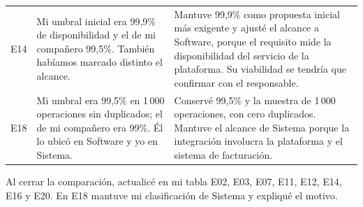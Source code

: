 \documentclass[10pt,letterpaper,landscape]{article}
\begin{document}
\begin{longtable}{@{}p{0.50in}p{3.18in}p{5.55in}@{}}
E14 & Mi umbral inicial era 99,9\% de disponibilidad y el de mi compañero 99,5\%. También habíamos marcado distinto el alcance. & Mantuve 99,9\% como propuesta inicial más exigente y ajusté el alcance a Software, porque el requisito mide la disponibilidad del servicio de la plataforma. Su viabilidad se tendría que confirmar con el responsable. \\
E18 & Mi umbral era 99,5\% en 1\,000 operaciones sin duplicados; el de mi compañero era 99\%. Él lo ubicó en Software y yo en Sistema. & Conservé 99,5\% y la muestra de 1\,000 operaciones, con cero duplicados. Mantuve el alcance de Sistema porque la integración involucra la plataforma y el sistema de facturación. \\
\end{longtable}
\normalsize

Al cerrar la comparación, actualicé en mi tabla E02, E03, E07, E11, E12, E14, E16 y E20. En E18 mantuve mi clasificación de Sistema y expliqué el motivo.



\end{document}
